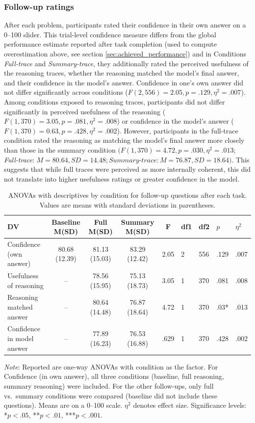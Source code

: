 \documentclass[acmlarge,review=true, anonymous=true]{acmart}
\begin{document}
\subsubsection{Follow-up ratings}
After each problem, participants rated their confidence in their own answer on a 0--100 slider. This trial-level confidence measure differs from the global performance estimate reported after task completion (used to compute overestimation above, see section \ref{sec:achieved_performance}) and in Conditions \textit{Full-trace} and \textit{Summary-trace}, they additionally rated the perceived usefulness of the reasoning traces, whether the reasoning matched the model's final answer, and their confidence in the model's answer. Confidence in one's own answer did not differ significantly across conditions ($F(2,556) = 2.05, p = .129, \eta^2 = .007$). Among conditions exposed to reasoning traces, participants did not differ significantly in perceived usefulness of the reasoning ($F(1,370) = 3.05, p = .081, \eta^2 = .008$) or confidence in the model's answer ($F(1,370) = 0.63, p = .428, \eta^2= .002$). However, participants in the full-trace condition rated the reasoning as matching the model's final answer more closely than those in the summary condition $(F(1,370) = 4.72, p = .030, \eta^2= .013$; \textit{Full-trace}: $M = 80.64, SD = 14.48; \textit{Summary-trace}: M = 76.87, SD = 18.64)$. This suggests that while full traces were perceived as more internally coherent, this did not translate into higher usefulness ratings or greater confidence in the model.


\begin{table}[H]
\centering
\caption{ANOVAs with descriptives by condition for follow-up questions after each task. Values are means with standard deviations in parentheses.}
\begin{tabular}{lccccllll}
\hline DV                        & Baseline M(SD) & Full M(SD)      & Summary M(SD)   & F    & df1 & df2 & $p$     & $\eta^2$ \\ \hline
Confidence (own answer)   & 80.68 (12.39)  & 81.13 (15.03)  & 83.29 (12.42)  & 2.05 & 2  & 556 & .129  & .007     \\
Usefulness of reasoning   & --  & 78.56 (15.95)   & 75.13 (18.73)   & 3.05 & 1   & 370  & .081     &  .008  \\
Reasoning matched answer  & --  & 80.64 (14.48)  & 76.87 (18.64)  & 4.72 & 1   & 370  & .03*   & .013   \\
Confidence in model answer    & --   & 77.89 (16.23)   & 76.53 (16.88)   & .629 & 1   & 370  &  .428 & .002      \\
\hline
\end{tabular}

\raggedright \small  \textit{Note}: Reported are one-way ANOVAs with condition as the factor. For Confidence (in own answer), all three conditions (baseline, full reasoning, summary reasoning) were included. For the other follow-ups, only full vs.~summary conditions were compared (baseline did not include these questions). Means are on a 0--100 scale. $\eta^2$ denotes effect size. Significance levels: *$p < .05$, **$p < .01$, ***$p < .001$.
\end{table}
\end{document}

